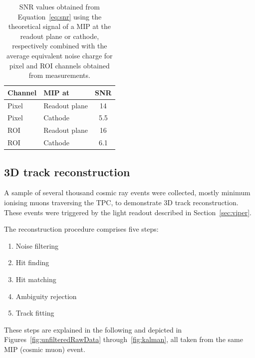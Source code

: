 \documentclass[a4paper]{article}
\begin{document}
\begin{table}[htb]
	\centering
	\caption{SNR values obtained from Equation~\eqref{eq:snr} using the theoretical signal of a MIP at the readout plane or cathode, respectively combined with the average equivalent noise charge for pixel and ROI channels obtained from measurements.}
	\label{tab:snr}
	\begin{tabu} to \textwidth {|l|l|S|}
		\hline
		{Channel} &	{MIP at} &			{SNR} \\
		\hline
		\hline
		{Pixel} &	{Readout plane} &	\num{14} \\
		\hline
		{Pixel} &	{Cathode} &			\num{5.5} \\
		\hline
		{ROI} &		{Readout plane} &	\num{16} \\
		\hline
		{ROI} &		{Cathode} &			\num{6.1} \\
		\hline
	\end{tabu}
\end{table}

\clearpage 

\subsection{3D track reconstruction}

A sample of several thousand cosmic ray events were collected, mostly minimum ionising muons traversing the TPC, to demonstrate 3D track reconstruction.
These events were triggered by the light readout described in Section~\ref{sec:viper}.

The reconstruction procedure comprises five steps:
\begin{enumerate}
	\item Noise filtering
	\item Hit finding
	\item Hit matching
	\item Ambiguity rejection
	\item Track fitting
\end{enumerate}

These steps are explained in the following and depicted in Figures~\ref{fig:unfilteredRawData} through~\ref{fig:kalman}, all taken from the same MIP (cosmic muon) event.
\end{document}
